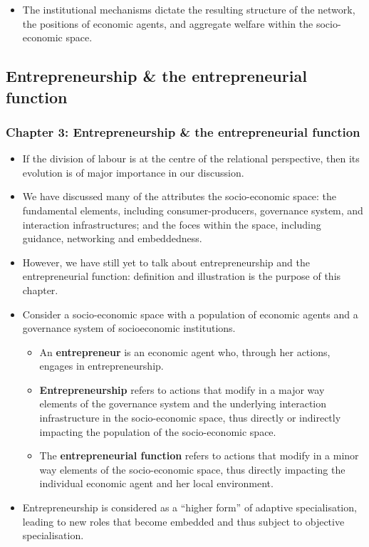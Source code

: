 \documentclass[10pt]{beamer}
\begin{document}
\begin{frame} %
\begin{itemize}
\item The institutional mechanisms dictate the resulting structure of the network, the positions of economic agents, and aggregate welfare within the socio-economic space.
\end{itemize}
\end{frame}

\subsection{Entrepreneurship \& the entrepreneurial function}

\begin{frame} \frametitle{Chapter 3: Entrepreneurship \& the entrepreneurial function}
\begin{itemize}
\item If the division of labour is at the centre of the relational perspective, then its evolution is of major importance in our discussion.
\medskip
\item We have discussed many of the attributes the socio-economic space: the fundamental elements, including consumer-producers, governance system, and interaction infrastructures; and the foces within the space, including guidance, networking and embeddedness.
\medskip
\item However, we have still yet to talk about entrepreneurship and the entrepreneurial function: definition and illustration is the purpose of this chapter.
\end{itemize}
\end{frame}


\begin{frame}
\begin{itemize}
\item Consider a socio-economic space with a population of economic agents and a governance system of socioeconomic institutions.
\begin{itemize}
\medskip
\item An \textbf{entrepreneur} is an economic agent who, through her actions, engages in entrepreneurship.
\medskip
\item \textbf{Entrepreneurship} refers to actions that modify in a major way elements of the governance system and the underlying interaction infrastructure in the socio-economic space, thus directly or indirectly impacting the population of the socio-economic space.
\medskip
\item The \textbf{entrepreneurial function} refers to actions that modify in a minor way elements of the socio-economic space, thus directly impacting the individual economic agent and her local environment.
\end{itemize}
\medskip
\item Entrepreneurship is considered as a ``higher form'' of adaptive specialisation, leading to new roles that become embedded and thus subject to objective specialisation.
\end{itemize}
\end{frame}
\end{document}
